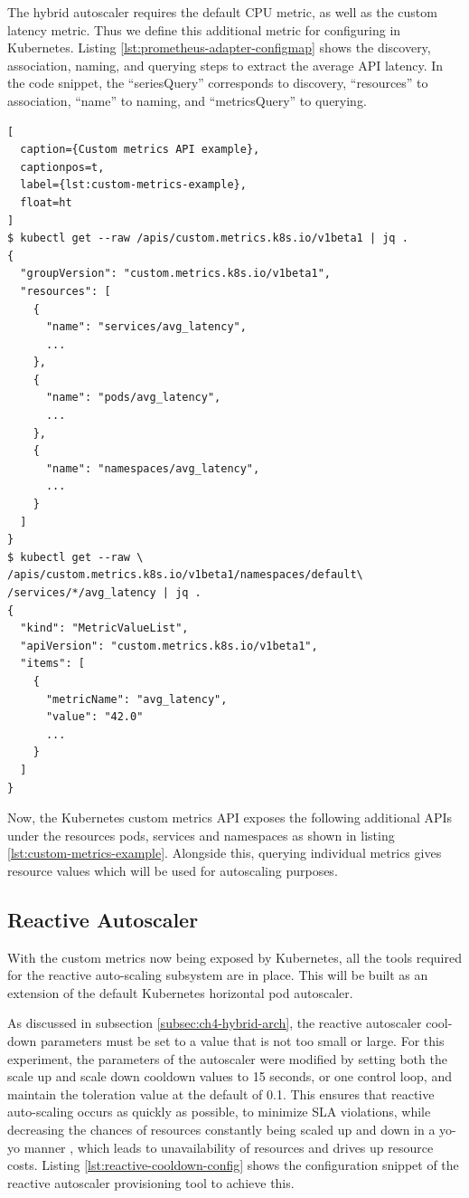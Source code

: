 The hybrid autoscaler requires the default CPU metric, as well as the custom latency metric. Thus we define this additional metric for configuring in Kubernetes. Listing \ref{lst:prometheus-adapter-configmap} shows the discovery, association, naming, and querying steps to extract the average API latency. In the code snippet, the ``seriesQuery'' corresponds to discovery, ``resources'' to association, ``name'' to naming, and ``metricsQuery'' to querying.

\begin{lstlisting}[
  caption={Custom metrics API example},
  captionpos=t,
  label={lst:custom-metrics-example},
  float=ht
]
$ kubectl get --raw /apis/custom.metrics.k8s.io/v1beta1 | jq .
{
  "groupVersion": "custom.metrics.k8s.io/v1beta1",
  "resources": [
    {
      "name": "services/avg_latency",
      ...
    },
    {
      "name": "pods/avg_latency",
      ...
    },
    {
      "name": "namespaces/avg_latency",
      ...
    }
  ]
}
$ kubectl get --raw \
/apis/custom.metrics.k8s.io/v1beta1/namespaces/default\
/services/*/avg_latency | jq .
{
  "kind": "MetricValueList",
  "apiVersion": "custom.metrics.k8s.io/v1beta1",
  "items": [
    {
      "metricName": "avg_latency",
      "value": "42.0"
      ...
    }
  ]
}
\end{lstlisting}

Now, the Kubernetes custom metrics API exposes the following additional APIs under the resources pods, services and namespaces as shown in listing \ref{lst:custom-metrics-example}. Alongside this, querying individual metrics gives resource values which will be used for autoscaling purposes.

\subsection{Reactive Autoscaler}
\label{subsec:reactive-auto-subsection}

With the custom metrics now being exposed by Kubernetes, all the tools required for the reactive auto-scaling subsystem are in place. This will be built as an extension of the default Kubernetes horizontal pod autoscaler.\par

As discussed in subsection \ref{subsec:ch4-hybrid-arch}, the reactive autoscaler cool-down parameters must be set to a value that is not too small or large. For this experiment, the parameters of the autoscaler were modified by setting both the scale up and scale down cooldown values to 15 seconds, or one control loop, and maintain the toleration value at the default of 0.1. This ensures that reactive auto-scaling occurs as quickly as possible, to minimize SLA violations, while decreasing the chances of resources constantly being scaled up and down in a yo-yo manner \cite{sides2015yo}, which leads to unavailability of resources and drives up resource costs. Listing \ref{lst:reactive-cooldown-config} shows the configuration snippet of the reactive autoscaler provisioning tool to achieve this.\par

